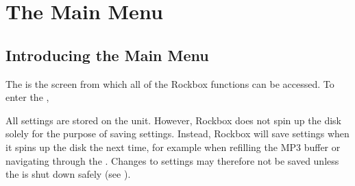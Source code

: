\chapter{The Main Menu}
\section{\label{ref:main_menu}Introducing the Main Menu}
The  is the screen from which all of the Rockbox functions can be 
accessed. To enter the , 

All settings are stored on the unit. However, Rockbox does not spin up 
the disk solely for the purpose of saving settings. Instead, Rockbox will
save settings when it spins up the disk the next time, for example when 
refilling the MP3 buffer or navigating through the .
Changes to settings may therefore not be saved unless the \dap{} is shut down
safely (see ).

